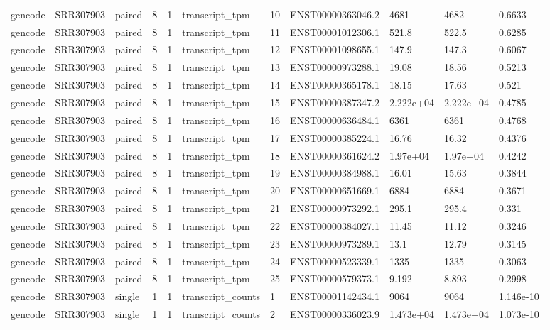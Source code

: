 \begin{tabular}{lllllllllll}
gencode & SRR307903 & paired & 8 & 1 & transcript\_tpm & 10 & ENST00000363046.2 & 4681 & 4682 & 0.6633 \\
gencode & SRR307903 & paired & 8 & 1 & transcript\_tpm & 11 & ENST00001012306.1 & 521.8 & 522.5 & 0.6285 \\
gencode & SRR307903 & paired & 8 & 1 & transcript\_tpm & 12 & ENST00001098655.1 & 147.9 & 147.3 & 0.6067 \\
gencode & SRR307903 & paired & 8 & 1 & transcript\_tpm & 13 & ENST00000973288.1 & 19.08 & 18.56 & 0.5213 \\
gencode & SRR307903 & paired & 8 & 1 & transcript\_tpm & 14 & ENST00000365178.1 & 18.15 & 17.63 & 0.521 \\
gencode & SRR307903 & paired & 8 & 1 & transcript\_tpm & 15 & ENST00000387347.2 & 2.222e+04 & 2.222e+04 & 0.4785 \\
gencode & SRR307903 & paired & 8 & 1 & transcript\_tpm & 16 & ENST00000636484.1 & 6361 & 6361 & 0.4768 \\
gencode & SRR307903 & paired & 8 & 1 & transcript\_tpm & 17 & ENST00000385224.1 & 16.76 & 16.32 & 0.4376 \\
gencode & SRR307903 & paired & 8 & 1 & transcript\_tpm & 18 & ENST00000361624.2 & 1.97e+04 & 1.97e+04 & 0.4242 \\
gencode & SRR307903 & paired & 8 & 1 & transcript\_tpm & 19 & ENST00000384988.1 & 16.01 & 15.63 & 0.3844 \\
gencode & SRR307903 & paired & 8 & 1 & transcript\_tpm & 20 & ENST00000651669.1 & 6884 & 6884 & 0.3671 \\
gencode & SRR307903 & paired & 8 & 1 & transcript\_tpm & 21 & ENST00000973292.1 & 295.1 & 295.4 & 0.331 \\
gencode & SRR307903 & paired & 8 & 1 & transcript\_tpm & 22 & ENST00000384027.1 & 11.45 & 11.12 & 0.3246 \\
gencode & SRR307903 & paired & 8 & 1 & transcript\_tpm & 23 & ENST00000973289.1 & 13.1 & 12.79 & 0.3145 \\
gencode & SRR307903 & paired & 8 & 1 & transcript\_tpm & 24 & ENST00000523339.1 & 1335 & 1335 & 0.3063 \\
gencode & SRR307903 & paired & 8 & 1 & transcript\_tpm & 25 & ENST00000579373.1 & 9.192 & 8.893 & 0.2998 \\
gencode & SRR307903 & single & 1 & 1 & transcript\_counts & 1 & ENST00001142434.1 & 9064 & 9064 & 1.146e-10 \\
gencode & SRR307903 & single & 1 & 1 & transcript\_counts & 2 & ENST00000336023.9 & 1.473e+04 & 1.473e+04 & 1.073e-10 \\

\end{tabular}
